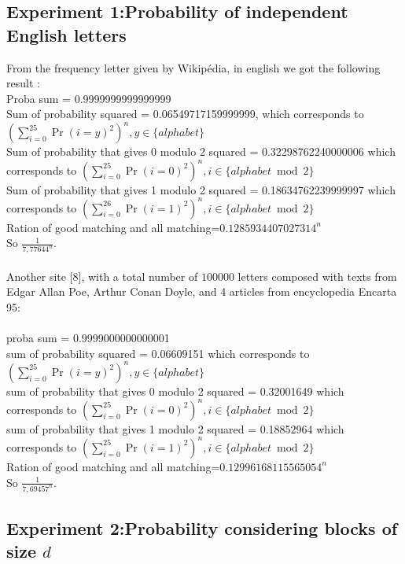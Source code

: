 \documentclass{article}
\begin{document}
\subsection{Experiment 1:Probability of independent English letters}
From the frequency letter given by Wikip\'edia, in english we got the following result :\\
Proba sum = 0.9999999999999999
\\
Sum of probability squared = 0.06549717159999999, which corresponds to $(\sum_{i=0}^{25}{\Pr(i=y)^2})^n, y \in \{alphabet\} $\\
Sum of probability that gives 0 modulo 2 squared  = 0.32298762240000006 which corresponds to $(\sum_{i=0}^{25}{\Pr(i=0)^2})^n, i \in \{alphabet \bmod 2\} $\\
Sum of probability that gives 1 modulo 2 squared = 0.18634762239999997 which corresponds to $(\sum_{i=0}^{26}{\Pr(i=1)^2})^n, i \in \{alphabet \bmod 2\} $\\
Ration of good matching and all matching=$0.1285934407027314^n$\\
So $\frac{1}{7,77644^n}$.
\\
\\
Another site [8], with a total number of $100000$ letters composed with texts from Edgar Allan Poe, Arthur Conan Doyle, and 4 articles from encyclopedia Encarta 95:\\
\\
proba sum = 0.9999000000000001\\
sum of probability squared = 0.06609151 which corresponds to $(\sum_{i=0}^{25}{\Pr(i=y)^2})^n, y \in \{alphabet\} $\\
sum of probability that gives 0 modulo 2 squared = 0.32001649 which corresponds to $(\sum_{i=0}^{25}{\Pr(i=0)^2})^n, i \in \{alphabet \bmod 2\} $\\
sum of probability that gives 1 modulo 2 squared = 0.18852964 which corresponds to $(\sum_{i=0}^{25}{\Pr(i=1)^2})^n, i \in \{alphabet \bmod 2\} $\\
Ration of good matching and all matching=$0.12996168115565054^n$\\
So $\frac{1}{7,69457^n}$.

\subsection*{Experiment 2:Probability considering blocks of size $d$}
\end{document}
